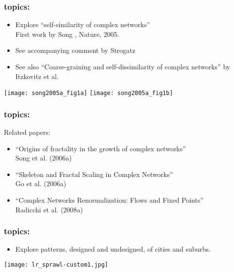   \begin{frame}
    \frametitle{topics:}

    \begin{block}{}
    \begin{itemize}
    \item<1->    
      Explore ``self-similarity of complex networks''\cite{song2005a,song2006a}\\
      First work by Song \etal, Nature, 2005.
    \item<1->
      See accompanying comment by Strogatz\cite{strogatz2005a}
    \item<1->
      See also ``Coarse-graining and self-dissimilarity of complex networks'' by
      Itzkovitz et al.\cite{itzkovitz2005a}
    \end{itemize}
    \texttt{[image: song2005a\_fig1a]}
    \texttt{[image: song2005a\_fig1b]}
    \end{block}

  \end{frame}


  \begin{frame}
    \frametitle{topics:}

    \begin{block}{Related papers:}
      \begin{itemize}
      \item
        ``Origins of fractality in the growth of complex networks''\\
        Song et al. (2006a)\cite{song2006a}
      \item
        ``Skeleton and Fractal Scaling in Complex Networks''\\
        Go et al. (2006a)\cite{goh2006a}
      \item
        ``Complex Networks Renormalization: Flows and Fixed Points''\\
        Radicchi et al. (2008a)\cite{radicchi2008a}
      \end{itemize}
    \end{block}
    
  \end{frame}

  \begin{frame}
    \frametitle{topics:}

    \begin{block}{}
    \begin{itemize}
    \item 
      Explore patterns, designed and undesigned, of cities
      and suburbs.
    \end{itemize}

    \begin{center}
      \texttt{[image: lr\_sprawl-custom1.jpg]}
    \end{center}
    \end{block}

  \end{frame}


